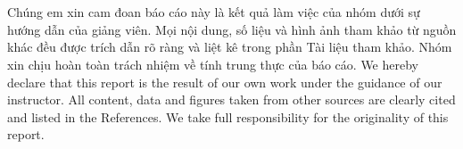 
\clearpage
\section*{\declarationname}

\ifreportvietnamese
Chúng em xin cam đoan báo cáo này là kết quả làm việc của nhóm dưới sự hướng dẫn của giảng viên. Mọi nội dung, số liệu và hình ảnh tham khảo từ nguồn khác đều được trích dẫn rõ ràng và liệt kê trong phần Tài liệu tham khảo. Nhóm xin chịu hoàn toàn trách nhiệm về tính trung thực của báo cáo.
\else
We hereby declare that this report is the result of our own work under the guidance of our instructor. All content, data and figures taken from other sources are clearly cited and listed in the References. We take full responsibility for the originality of this report.
\fi

\printsignaturetable
